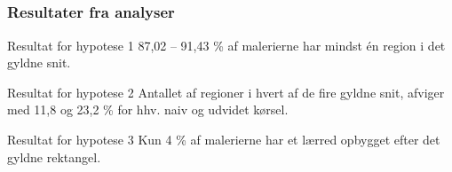\documentclass[xcolor=table]{beamer}
\begin{document}
\subsection*{}
\begin{frame}

    \frametitle{Resultater fra analyser}

    \begin{block}{Resultat for hypotese 1\hspace{14em}}
        87,02 -- 91,43 \% af malerierne har mindst én region i det gyldne snit.
    \end{block}

    \begin{block}{Resultat for hypotese 2\hspace{16em}}
        Antallet af regioner i hvert af de fire gyldne snit, afviger med 11,8 og 23,2 \% for hhv. naiv og udvidet kørsel.
    \end{block}

    \begin{block}{Resultat for hypotese 3\hspace{16em}}
        Kun 4 \% af malerierne har et lærred opbygget efter det gyldne rektangel.
    \end{block}

\end{frame}
\end{document}
